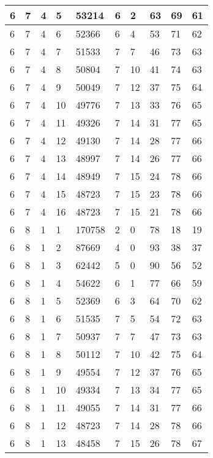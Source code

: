 \begin{table}[!ht]
\begin{tabular}{|l|l|l|l|l|l|l|l|l|l|}
        6 & 7 & 4 & 5 & 53214 & 6 & 2 & 63 & 69 & 61 \\ \hline
        6 & 7 & 4 & 6 & 52366 & 6 & 4 & 53 & 71 & 62 \\ \hline
        6 & 7 & 4 & 7 & 51533 & 7 & 7 & 46 & 73 & 63 \\ \hline
        6 & 7 & 4 & 8 & 50804 & 7 & 10 & 41 & 74 & 63 \\ \hline
        6 & 7 & 4 & 9 & 50049 & 7 & 12 & 37 & 75 & 64 \\ \hline
        6 & 7 & 4 & 10 & 49776 & 7 & 13 & 33 & 76 & 65 \\ \hline
        6 & 7 & 4 & 11 & 49326 & 7 & 14 & 31 & 77 & 65 \\ \hline
        6 & 7 & 4 & 12 & 49130 & 7 & 14 & 28 & 77 & 66 \\ \hline
        6 & 7 & 4 & 13 & 48997 & 7 & 14 & 26 & 77 & 66 \\ \hline
        6 & 7 & 4 & 14 & 48949 & 7 & 15 & 24 & 78 & 66 \\ \hline
        6 & 7 & 4 & 15 & 48723 & 7 & 15 & 23 & 78 & 66 \\ \hline
        6 & 7 & 4 & 16 & 48723 & 7 & 15 & 21 & 78 & 66 \\ \hline
        6 & 8 & 1 & 1 & 170758 & 2 & 0 & 78 & 18 & 19 \\ \hline
        6 & 8 & 1 & 2 & 87669 & 4 & 0 & 93 & 38 & 37 \\ \hline
        6 & 8 & 1 & 3 & 62442 & 5 & 0 & 90 & 56 & 52 \\ \hline
        6 & 8 & 1 & 4 & 54622 & 6 & 1 & 77 & 66 & 59 \\ \hline
        6 & 8 & 1 & 5 & 52369 & 6 & 3 & 64 & 70 & 62 \\ \hline
        6 & 8 & 1 & 6 & 51535 & 7 & 5 & 54 & 72 & 63 \\ \hline
        6 & 8 & 1 & 7 & 50937 & 7 & 7 & 47 & 73 & 63 \\ \hline
        6 & 8 & 1 & 8 & 50112 & 7 & 10 & 42 & 75 & 64 \\ \hline
        6 & 8 & 1 & 9 & 49554 & 7 & 12 & 37 & 76 & 65 \\ \hline
        6 & 8 & 1 & 10 & 49334 & 7 & 13 & 34 & 77 & 65 \\ \hline
        6 & 8 & 1 & 11 & 49055 & 7 & 14 & 31 & 77 & 66 \\ \hline
        6 & 8 & 1 & 12 & 48723 & 7 & 14 & 28 & 78 & 66 \\ \hline
        6 & 8 & 1 & 13 & 48458 & 7 & 15 & 26 & 78 & 67 \\ \hline

\end{tabular}
\end{table}
